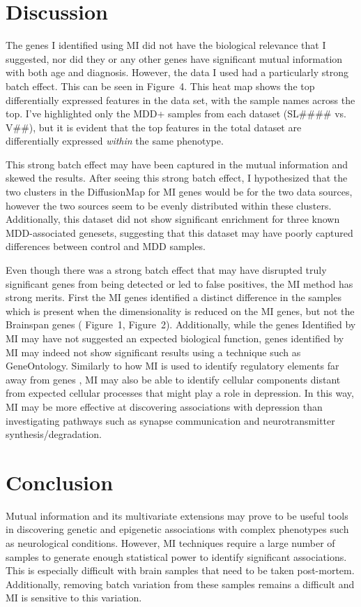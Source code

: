 \documentclass{bioinfo}
\begin{document}
\section{Discussion}
The genes I identified using MI did not have the biological relevance that I suggested, nor did they or any other genes have significant mutual information with both age and diagnosis.  However, the data I used had a particularly strong batch effect.  This can be seen in Figure~4\vphantom{\ref{fig:04}}.  This heat map shows the top differentially expressed features in the data set, with the sample names across the top.  I've highlighted only the MDD+ samples from each dataset
(SL#### vs. V##), but it is evident that the top features in the total dataset are differentially expressed {\it within} the same phenotype.  

This strong batch effect may have been captured in the mutual information and skewed the results.  After seeing this strong batch effect, I hypothesized that the two clusters in the DiffusionMap for MI genes would be for the two data sources, however the two sources seem to be evenly distributed within these clusters.  Additionally, this dataset did not show significant enrichment for three known MDD-associated genesets, suggesting that this dataset may have poorly captured
differences between control and MDD samples.

Even though there was a strong batch effect that may have disrupted truly significant genes from being detected or led to false positives, the MI method has strong merits.  First the MI genes identified a distinct difference in the samples which is present when the dimensionality is reduced on the MI genes, but not the Brainspan genes ( Figure~1\vphantom{\ref{fig:01}},  Figure~2\vphantom{\ref{fig:02}}).  Additionally, while the genes Identified by MI may have not suggested an
expected biological function, genes identified by MI may indeed not show significant results using a technique such as GeneOntology.  Similarly to how MI is used to identify regulatory elements far away from genes \citep{Elemento}, MI may also be able to identify cellular components distant from expected cellular processes that might play a role in depression.  In this way, MI may be more effective at discovering associations with depression than investigating pathways such as synapse
communication and neurotransmitter synthesis/degradation.

\section{Conclusion}
Mutual information and its multivariate extensions may prove to be useful tools in discovering genetic and epigenetic associations with complex phenotypes such as neurological conditions.  However, MI techniques require a large number of samples to generate enough statistical power to identify significant associations.  This is especially difficult with brain samples that need to be taken post-mortem.  Additionally, removing batch variation from these samples remains a difficult
and MI is sensitive to this variation.  
\end{document}
